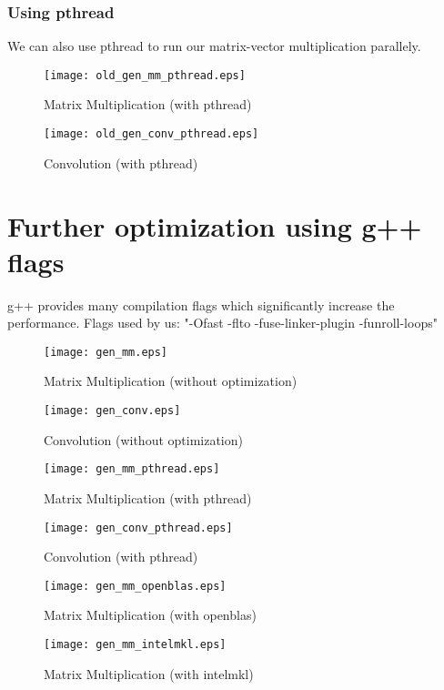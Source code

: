 \documentclass{article}
\begin{document}
\newpage
    \subsubsection{Using pthread}
        We can also use pthread to run our matrix-vector multiplication parallely.
    \begin{figure}[!htb]
    \centering
        \texttt{[image: old\_gen\_mm\_pthread.eps]}
        \caption{Matrix Multiplication (with pthread)}
    \end{figure}
    \begin{figure}[!htb]
    \centering
        \texttt{[image: old\_gen\_conv\_pthread.eps]}
        \caption{Convolution (with pthread)}
    \end{figure}

\newpage
    \section{Further optimization using g++ flags}
        g++ provides many compilation flags which significantly increase the performance.
        Flags used by us: "-Ofast -flto -fuse-linker-plugin -funroll-loops"

    \begin{figure}[!htb]
    \centering
        \texttt{[image: gen\_mm.eps]}
        \caption{Matrix Multiplication (without optimization)}
    \end{figure}
    \begin{figure}[!htb]
    \centering
        \texttt{[image: gen\_conv.eps]}
        \caption{Convolution (without optimization)}
    \end{figure}

    \begin{figure}[!htb]
    \centering
        \texttt{[image: gen\_mm\_pthread.eps]}
        \caption{Matrix Multiplication (with pthread)}
    \end{figure}
    \begin{figure}[!htb]
    \centering
        \texttt{[image: gen\_conv\_pthread.eps]}
        \caption{Convolution (with pthread)}
    \end{figure}

    \begin{figure}[!htb]
    \centering
        \texttt{[image: gen\_mm\_openblas.eps]}
        \caption{Matrix Multiplication (with openblas)}
    \end{figure}
    \begin{figure}[!htb]
    \centering
        \texttt{[image: gen\_mm\_intelmkl.eps]}
        \caption{Matrix Multiplication (with intelmkl)}
    \end{figure}

\clearpage


\end{document}
